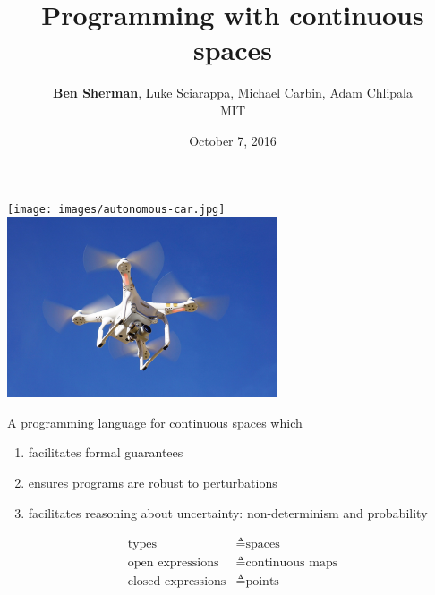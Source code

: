 \documentclass[14pt]{beamer}
\title{Programming with continuous spaces}
\author{\textbf{Ben Sherman}, Luke Sciarappa, Michael Carbin, Adam Chlipala
\\ \small MIT}
\date{October 7, 2016}
\begin{document}
\maketitle

\begin{frame}
\begin{center}
\texttt{[image: images/autonomous-car.jpg]}
\\
\includegraphics[width=0.6\textwidth]{images/drone.jpg}
\end{center}
\end{frame}

\begin{frame}
A programming language for continuous spaces which
\begin{enumerate}
\item facilitates formal guarantees
\item ensures programs are robust to perturbations
\item facilitates reasoning about uncertainty: non-determinism and probability
\end{enumerate}
\end{frame}

\begin{frame}

\begin{center}
\Large 
\begin{align*}
\text{types} &\triangleq \text{spaces}
\\
\text{open expressions} &\triangleq \text{continuous maps}
\\
\text{closed expressions} &\triangleq \text{points}
\end{align*}
\end{center}
\end{frame}
\end{document}
